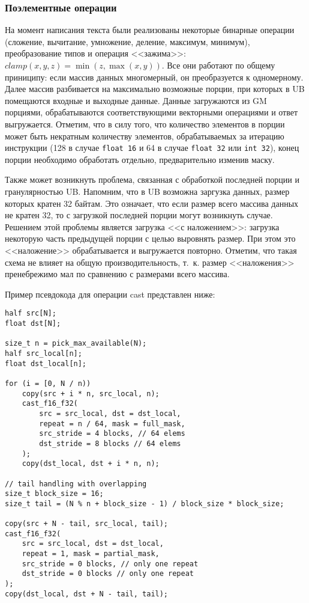 \subsubsection{Поэлементные операции}

На момент написания текста были реализованы некоторые бинарные операции
(сложение, вычитание, умножение, деление, максимум, минимум), преобразование
типов и операция <<зажима>>: $clamp(x, y, z) = \min(z, \max(x, y))$. Все они
работают по общему приниципу: если массив данных многомерный, он преобразуется
к одномерному. Далее массив разбивается на максимально возможные порции,
при которых в UB помещаются входные и выходные данные. Данные загружаются из
GM порциями, обрабатываются соответствующими векторными операциями и ответ
выгружается. Отметим, что в силу того, что количество элементов в порции
может быть некратным количеству элементов, обрабатываемых за итерацию инструкции
(128 в случае \texttt{float 16} и 64 в случае \texttt{float 32} или
\texttt{int 32}), конец порции необходимо обработать отдельно, предварительно
изменив маску.

Также может возникнуть проблема, связанная с обработкой последней порции и
гранулярностью UB. Напомним, что в UB возможна заргузка данных, размер которых
кратен 32 байтам. Это означает, что если размер всего массива данных не кратен
32, то с загрузкой последней порции могут возникнуть случае. Решением этой
проблемы является загрузка <<с наложением>>: загрузка некоторую часть предыдущей
порции с целью выровнять размер. При этом это <<наложение>> обрабатывается и
выгружается повторно. Отметим, что такая схема не влияет на общую
производительность, т.~к. размер <<наложения>> пренебрежимо мал по сравнению
с размерами всего массива.

Пример псевдокода для операции cast представлен ниже:

\begin{lstlisting}[caption={Алгоритм оператора \texttt{cast}}]
half src[N];
float dst[N];

size_t n = pick_max_available(N);
half src_local[n];
float dst_local[n];

for (i = [0, N / n))
    copy(src + i * n, src_local, n);
    cast_f16_f32(
        src = src_local, dst = dst_local,
        repeat = n / 64, mask = full_mask,
        src_stride = 4 blocks, // 64 elems
        dst_stride = 8 blocks // 64 elems
    );
    copy(dst_local, dst + i * n, n);

// tail handling with overlapping
size_t block_size = 16;
size_t tail = (N % n + block_size - 1) / block_size * block_size;

copy(src + N - tail, src_local, tail);
cast_f16_f32(
    src = src_local, dst = dst_local,
    repeat = 1, mask = partial_mask,
    src_stride = 0 blocks, // only one repeat
    dst_stride = 0 blocks // only one repeat
);
copy(dst_local, dst + N - tail, tail);
\end{lstlisting}

